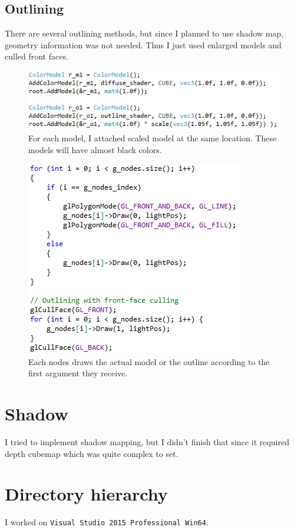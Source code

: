 \documentclass[11pt]{article}
\begin{document}
\subsection{Outlining} \label{ssec:2.2}
There are several outlining methods, but since I planned to use shadow map, geometry information was not needed. Thus I just used enlarged models and culled front faces.
\begin{figure}[htb]
	\begin{center}
		\includegraphics[width=0.7\linewidth]{scaledModel.png}
	\end{center}
	\caption{For each model, I attached scaled model at the same location. These models will have almost black colors.}
\end{figure}
\begin{figure}[htb]
	\begin{center}
		\includegraphics[width=0.5\linewidth]{judgeOutline.png}
	\end{center}
	\caption{Each nodes draws the actual model or the outline according to the first argument they receive.}
\end{figure}

\newpage
\section{Shadow} \label{sec:3}
I tried to implement shadow mapping, but I didn't finish that since it required depth cubemap which was quite complex to set.

\section{Directory hierarchy}
I worked on \texttt{Visual Studio 2015 Professional Win64}.
\end{document}
